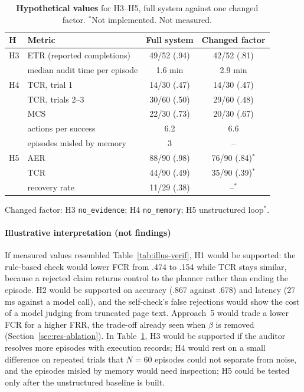 \begin{table}[h]
\centering
\caption{\textbf{Hypothetical values} for H3--H5, full system against one changed factor. $^{*}$Not implemented. Not measured.}
\label{tab:illus-h345}
\footnotesize
\setlength{\tabcolsep}{2.5pt}
\begin{tabular}{@{}llcc@{}}
\toprule
H & Metric & Full system & Changed factor \\
\midrule
H3 & ETR (reported completions) & 49/52 (.94) & 42/52 (.81) \\
   & median audit time per episode & 1.6 min & 2.9 min \\
\midrule
H4 & TCR, trial 1 & 14/30 (.47) & 14/30 (.47) \\
   & TCR, trials 2--3 & 30/60 (.50) & 29/60 (.48) \\
   & MCS & 22/30 (.73) & 20/30 (.67) \\
   & actions per success & 6.2 & 6.6 \\
   & episodes misled by memory & 3 & -- \\
\midrule
H5 & AER & 88/90 (.98) & 76/90 (.84)$^{*}$ \\
   & TCR & 44/90 (.49) & 35/90 (.39)$^{*}$ \\
   & recovery rate & 11/29 (.38) & --$^{*}$ \\
\bottomrule
\end{tabular}

\vspace{2pt}\raggedright\scriptsize Changed factor: H3 \texttt{no\_evidence}; H4 \texttt{no\_memory}; H5 unstructured loop$^{*}$.
\end{table}

\paragraph{Illustrative interpretation (not findings)} If measured values resembled Table~\ref{tab:illus-verif}, H1 would be supported: the rule-based check would lower FCR from .474 to .154 while TCR stays similar, because a rejected claim returns control to the planner rather than ending the episode. H2 would be supported on accuracy (.867 against .678) and latency (27\,ms against a model call), and the self-check's false rejections would show the cost of a model judging from truncated page text. Approach~5 would trade a lower FCR for a higher FRR, the trade-off already seen when $\beta$ is removed (Section~\ref{sec:res-ablation}). In Table~\ref{tab:illus-h345}, H3 would be supported if the auditor resolves more episodes with execution records; H4 would rest on a small difference on repeated trials that $N=60$ episodes could not separate from noise, and the episodes misled by memory would need inspection; H5 could be tested only after the unstructured baseline is built.

